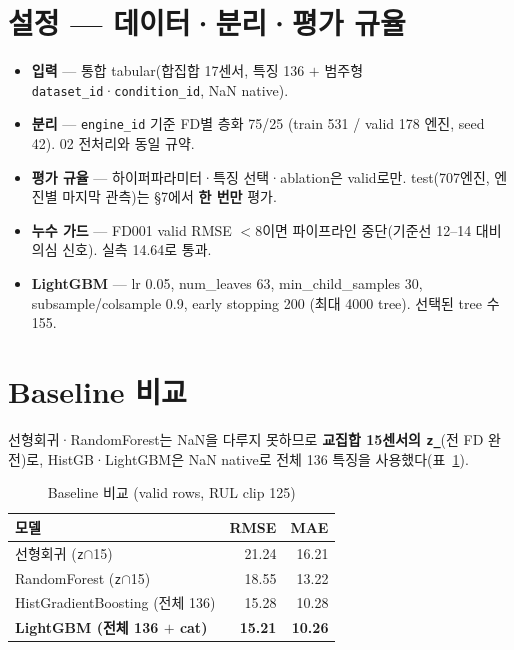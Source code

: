 \documentclass[11pt]{article}
\begin{document}
\tableofcontents
\newpage

\section{설정 — 데이터·분리·평가 규율}

\begin{itemize}[nosep]
  \item \textbf{입력} — 통합 tabular(합집합 17센서, 특징 136 $+$ 범주형 \texttt{dataset\_id}·\texttt{condition\_id}, NaN native).
  \item \textbf{분리} — \texttt{engine\_id} 기준 FD별 층화 75/25 (train 531 / valid 178 엔진, seed 42). 02 전처리와 동일 규약.
  \item \textbf{평가 규율} — 하이퍼파라미터·특징 선택·ablation은 valid로만. test(707엔진, 엔진별 마지막 관측)는 \S7에서 \textbf{한 번만} 평가.
  \item \textbf{누수 가드} — FD001 valid RMSE $<8$이면 파이프라인 중단(기준선 12--14 대비 의심 신호). 실측 14.64로 통과.
  \item \textbf{LightGBM} — lr 0.05, num\_leaves 63, min\_child\_samples 30, subsample/colsample 0.9, early stopping 200 (최대 4000 tree). 선택된 tree 수 155.
\end{itemize}

\section{Baseline 비교}

선형회귀·RandomForest는 NaN을 다루지 못하므로 \textbf{교집합 15센서의 \texttt{z\_}}(전 FD 완전)로,
HistGB·LightGBM은 NaN native로 전체 136 특징을 사용했다(표~\ref{tab:base}).

\begin{table}[H]
\centering
\caption{Baseline 비교 (valid rows, RUL clip 125)}
\label{tab:base}
\begin{tabular}{lrr}
\toprule
모델 & RMSE & MAE \\
\midrule
선형회귀 (\texttt{z}$\cap$15) & 21.24 & 16.21 \\
RandomForest (\texttt{z}$\cap$15) & 18.55 & 13.22 \\
HistGradientBoosting (전체 136) & 15.28 & 10.28 \\
\textbf{LightGBM (전체 136 $+$ cat)} & \textbf{15.21} & \textbf{10.26} \\
\bottomrule
\end{tabular}
\end{table}
\end{document}
